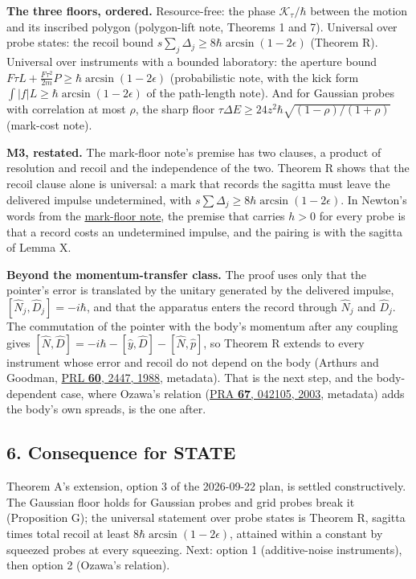 \documentclass[11pt,a4paper]{article}
\begin{document}
\textbf{The three floors, ordered.} Resource-free: the phase
\(\mathcal K_\tau/\hbar\) between the motion and its inscribed polygon
(polygon-lift note, Theorems 1 and 7). Universal over probe states: the
recoil bound \(s\sum_j\Delta_j\ge8\hbar\arcsin(1-2\epsilon)\) (Theorem
R). Universal over instruments with a bounded laboratory: the aperture
bound \(F\tau L+\frac{F\tau^2}{2m}P\ge\hbar\arcsin(1-2\epsilon)\)
(probabilistic note, with the kick form
\(\int|f|L\ge\hbar\arcsin(1-2\epsilon)\) of the path-length note). And
for Gaussian probes with correlation at most \(\rho\), the sharp floor
\(\tau\Delta E\ge24z^2\hbar\sqrt{(1-\rho)/(1+\rho)}\) (mark-cost note).

\textbf{M3, restated.} The mark-floor note's premise has two clauses, a
product of resolution and recoil and the independence of the two.
Theorem R shows that the recoil clause alone is universal: a mark that
records the sagitta must leave the delivered impulse undetermined, with
\(s\sum\Delta_j\ge8\hbar\arcsin(1-2\epsilon)\). In Newton's words from
the \href{newton-mark-floor.md}{mark-floor note}, the premise that
carries \(h>0\) for every probe is that a record costs an undetermined
impulse, and the pairing is with the sagitta of Lemma X.

\textbf{Beyond the momentum-transfer class.} The proof uses only that
the pointer's error is translated by the unitary generated by the
delivered impulse, \([\hat N_j,\hat D_j]=-i\hbar\), and that the
apparatus enters the record through \(\hat N_j\) and \(\hat D_j\). The
commutation of the pointer with the body's momentum after any coupling
gives \([\hat N,\hat D]=-i\hbar-[\hat y,\hat D]-[\hat N,\hat p]\), so
Theorem R extends to every instrument whose error and recoil do not
depend on the body (Arthurs and Goodman,
\href{https://doi.org/10.1103/PhysRevLett.60.2447}{PRL \textbf{60},
2447, 1988}, metadata). That is the next step, and the body-dependent
case, where Ozawa's relation
(\href{https://doi.org/10.1103/PhysRevA.67.042105}{PRA \textbf{67},
042105, 2003}, metadata) adds the body's own spreads, is the one after.

\hypertarget{consequence-for-state}{%
\subsection{6. Consequence for STATE}\label{consequence-for-state}}

Theorem A's extension, option 3 of the 2026-09-22 plan, is settled
constructively. The Gaussian floor holds for Gaussian probes and grid
probes break it (Proposition G); the universal statement over probe
states is Theorem R, sagitta times total recoil at least
\(8\hbar\arcsin(1-2\epsilon)\), attained within a constant by squeezed
probes at every squeezing. Next: option 1 (additive-noise instruments),
then option 2 (Ozawa's relation).
\end{document}
